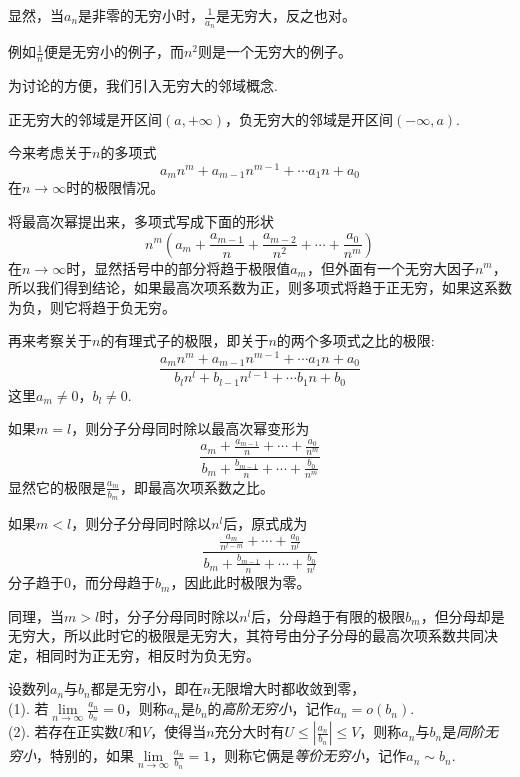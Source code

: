 显然，当$a_n$是非零的无穷小时，$\frac{1}{a_n}$是无穷大，反之也对。

例如$\frac{1}{n}$便是无穷小的例子，而$n^2$则是一个无穷大的例子。

为讨论的方便，我们引入无穷大的邻域概念.
\begin{definition}
  正无穷大的邻域是开区间$(a,+\infty)$，负无穷大的邻域是开区间$(-\infty,a)$.
\end{definition}

\begin{example}
  今来考虑关于$n$的多项式
  \[ a_mn^m+a_{m-1}n^{m-1} + \cdots a_1n+a_0 \]
  在$n \to \infty$时的极限情况。

  将最高次幂提出来，多项式写成下面的形状
  \[ n^m \left( a_m+\frac{a_{m-1}}{n}+\frac{a_{m-2}}{n^2} + \cdots + \frac{a_0}{n^m} \right) \]
  在$n \to \infty$时，显然括号中的部分将趋于极限值$a_m$，但外面有一个无穷大因子$n^m$，所以我们得到结论，如果最高次项系数为正，则多项式将趋于正无穷，如果这系数为负，则它将趋于负无穷。
\end{example}

\begin{example}
  再来考察关于$n$的有理式子的极限，即关于$n$的两个多项式之比的极限:
  \[ \frac{a_mn^m+a_{m-1}n^{m-1} + \cdots a_1n+a_0}{b_ln^l+b_{l-1}n^{l-1} + \cdots b_1n+b_0} \]
  这里$a_m \neq 0$，$b_l \neq 0$.

  如果$m=l$，则分子分母同时除以最高次幂变形为
  \[ \frac{a_m+\frac{a_{m-1}}{n}+\cdots+\frac{a_0}{n^m}}{b_m+\frac{b_{m-1}}{n}+\cdots+\frac{b_0}{n^m}} \]
  显然它的极限是$\frac{a_m}{b_m}$，即最高次项系数之比。

  如果$m<l$，则分子分母同时除以$n^l$后，原式成为
  \[ \frac{\frac{a_m}{n^{l-m}}+\cdots+\frac{a_0}{n^l}}{b_m+\frac{b_{m-1}}{n}+\cdots+\frac{b_0}{n^l}} \]
  分子趋于$0$，而分母趋于$b_m$，因此此时极限为零。

  同理，当$m>l$时，分子分母同时除以$n^l$后，分母趋于有限的极限$b_m$，但分母却是无穷大，所以此时它的极限是无穷大，其符号由分子分母的最高次项系数共同决定，相同时为正无穷，相反时为负无穷。
\end{example}

\begin{definition}
   设数列$a_n$与$b_n$都是无穷小，即在$n$无限增大时都收敛到零，\\
  (1). 若$\lim\limits_{n \to \infty} \frac{a_n}{b_n} = 0$，则称$a_n$是$b_n$的\emph{高阶无穷小}，记作$a_n=o(b_n)$. \\
  (2). 若存在正实数$U$和$V$，使得当$n$充分大时有$U\leqslant \left| \frac{a_n}{b_n} \right| \leqslant V$，则称$a_n$与$b_n$是\emph{同阶无穷小}，特别的，如果$\lim\limits_{n \to \infty} \frac{a_n}{b_n} = 1$，则称它俩是\emph{等价无穷小}，记作$a_n \sim b_n$.
\end{definition}

